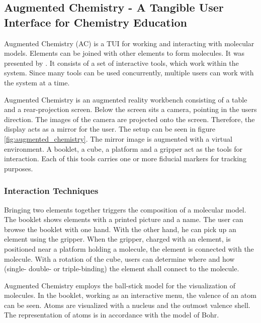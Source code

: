 \subsection{Augmented Chemistry - A Tangible User Interface for Chemistry Education}
Augmented Chemistry (AC) is a TUI for working and interacting with molecular models. Elements can be joined with other elements to form molecules. It was presented by \cite{fjeld02}. It consists of a set of interactive tools, which work within the system. Since many tools can be used concurrently, multiple users can work with the system at a time.

Augmented Chemistry is an augmented reality workbench consisting of a table and a rear-projection screen. Below the screen sits a camera, pointing in the users direction. The images of the camera are projected onto the screen. Therefore, the display acts as a mirror for the user. The setup can be seen in figure \ref{fig:augmented_chemistry}. The mirror image is augmented with a virtual environment. A booklet, a cube, a platform and a gripper act as the tools for interaction. Each of this tools carries one or more fiducial markers for tracking purposes. 

\subsubsection{Interaction Techniques}
Bringing two elements together triggers the composition of a molecular model. The booklet shows elements with a printed picture and a name. The user can browse the booklet with one hand. With the other hand, he can pick up an element using the gripper. When the gripper, charged with an element, is positioned near a platform holding a molecule, the element is connected with the molecule. With a rotation of the cube, users can determine where and how (single- double- or triple-binding) the element shall connect to the molecule.

Augmented Chemistry employs the ball-stick model for the visualization of molecules. In the booklet, working as an interactive menu, the valence of an atom can be seen. Atoms are visualized with a nucleus and the outmost valence shell. The representation of atoms is in accordance with the model of Bohr.